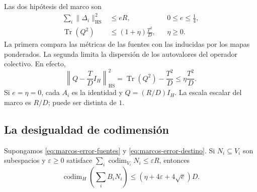 Las dos hipótesis del marco son
\begin{align}
 \sum_i\|\Delta_i\|_{\mathrm{HS}}^2&\le eR,
       &&0\le e\le\tfrac14,
       \label{eq:marcos-error-fuentes}\\
 \operatorname{Tr}(Q^2)&\le(1+\eta)\frac{T^2}{D},
       &&\eta\ge0.
       \label{eq:marcos-error-destino}
\end{align}
La primera compara las métricas de las fuentes con las inducidas por
los mapas ponderados. La segunda limita la dispersión de los autovalores
del operador colectivo. En efecto,
\begin{equation}
 \left\|Q-\frac TD I_H\right\|_{\mathrm{HS}}^2
 =\operatorname{Tr}(Q^2)-\frac{T^2}{D}
 \le\eta\frac{T^2}{D}.
 \label{eq:marcos-varianza}
\end{equation}
Si $e=\eta=0$, cada $A_i$ es la identidad y $Q=(R/D)I_H$.
La escala escalar del marco es $R/D$; puede ser distinta de $1$.

\subsection{La desigualdad de codimensión}

\begin{proposicion}
Supongamos \eqref{eq:marcos-error-fuentes} y
\eqref{eq:marcos-error-destino}. Si $N_i\subseteq V_i$ son
subespacios y $\varepsilon\ge0$ satisface
$\sum_i\operatorname{codim}_{V_i}N_i\le\varepsilon R$, entonces
\begin{equation}
 \operatorname{codim}_H\left(\sum_i B_iN_i\right)
 \le(\eta+4\varepsilon+4\sqrt e)D.
 \label{eq:marcos-codimension}
\end{equation}
\label{prop:marco-lineal}
\end{proposicion}

